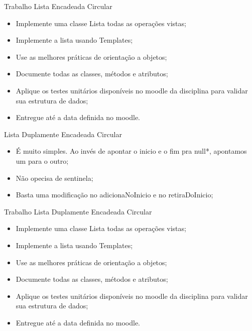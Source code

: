 \documentclass[12pt,table,xcolor={dvipsnames}]{beamer}
\begin{document}
\begin{frame}[fragile]{Trabalho Lista Encadeada Circular}
\begin{itemize}
\item Implemente uma classe Lista todas as operações vistas;
\item Implemente a lista usando Templates;
\item Use as melhores práticas de orientação a objetos;
\item Documente todas as classes, métodos e atributos;
\item Aplique os testes unitários disponíveis no moodle da disciplina para validar sua estrutura de dados;
\item Entregue até a data definida no moodle.
\end{itemize}
\end{frame}

\begin{frame}[fragile]{Lista Duplamente Encadeada Circular}
\begin{itemize}
\item É muito simples. Ao invés de apontar o inicio e o fim pra null*, apontamos um para o outro;
\item Não opecisa de sentinela;
\item Basta uma modificação no adicionaNoInicio e no retiraDoInicio;
\end{itemize}
\end{frame}

\begin{frame}[fragile]{Trabalho Lista Duplamente Encadeada Circular}
\begin{itemize}
\item Implemente uma classe Lista todas as operações vistas;
\item Implemente a lista usando Templates;
\item Use as melhores práticas de orientação a objetos;
\item Documente todas as classes, métodos e atributos;
\item Aplique os testes unitários disponíveis no moodle da disciplina para validar sua estrutura de dados;
\item Entregue até a data definida no moodle.
\end{itemize}
\end{frame}
\end{document}
